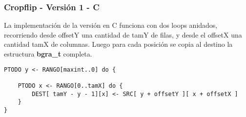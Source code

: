 \subsubsection{Cropflip - Versión 1 - C}
La implementación de la versión en C funciona con dos loops anidados, recorriendo desde offsetY una cantidad de tamY de filas, y desde el offsetX una cantidad tamX de columnas.
Luego para cada posición se copia al destino la estructura \textbf{bgra_t} completa.

\begin{lstlisting}[frame=single]
PTODO y <- RANGO[maxint..0] do { 

	PTODO x <- RANGO[0..tamX] do {
		DEST[ tamY - y - 1][x] <- SRC[ y + offsetY ][ x + offsetX ]
	}
}
\end{lstlisting}